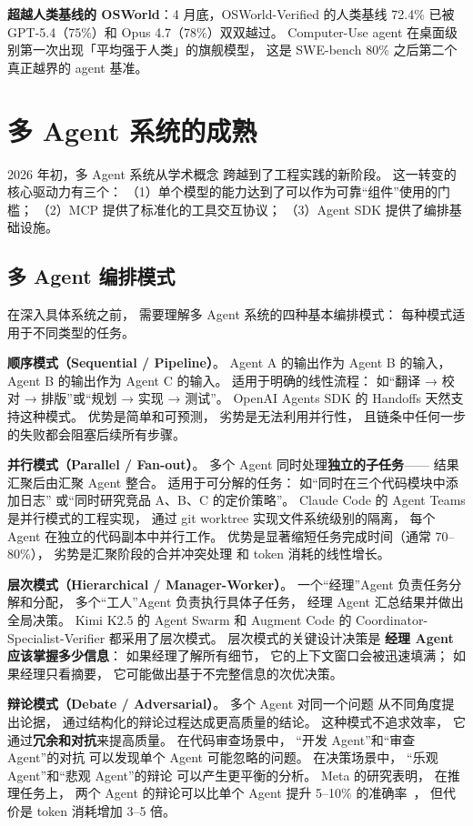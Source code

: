\textbf{超越人类基线的 OSWorld}：4 月底，OSWorld-Verified 的人类基线 72.4\%
已被 GPT-5.4（75\%）和 Opus 4.7（78\%）双双越过。
Computer-Use agent 在桌面级别第一次出现「平均强于人类」的旗舰模型，
这是 SWE-bench 80\% 之后第二个真正越界的 agent 基准。


\section{多 Agent 系统的成熟}
\label{sec:multi-agent-maturity}

2026 年初，多 Agent 系统从学术概念
跨越到了工程实践的新阶段。
这一转变的核心驱动力有三个：
（1）单个模型的能力达到了可以作为可靠“组件”使用的门槛；
（2）MCP 提供了标准化的工具交互协议；
（3）Agent SDK 提供了编排基础设施。

\subsection{多 Agent 编排模式}

在深入具体系统之前，
需要理解多 Agent 系统的四种基本编排模式：
每种模式适用于不同类型的任务。

\textbf{顺序模式（Sequential / Pipeline）}。
Agent A 的输出作为 Agent B 的输入，
Agent B 的输出作为 Agent C 的输入。
适用于明确的线性流程：
如“翻译 → 校对 → 排版”或“规划 → 实现 → 测试”。
OpenAI Agents SDK 的 Handoffs 天然支持这种模式。
优势是简单和可预测，
劣势是无法利用并行性，
且链条中任何一步的失败都会阻塞后续所有步骤。

\textbf{并行模式（Parallel / Fan-out）}。
多个 Agent 同时处理\textbf{独立的子任务}——
结果汇聚后由汇聚 Agent 整合。
适用于可分解的任务：
如“同时在三个代码模块中添加日志”
或“同时研究竞品 A、B、C 的定价策略”。
Claude Code 的 Agent Teams 是并行模式的工程实现，
通过 git worktree 实现文件系统级别的隔离，
每个 Agent 在独立的代码副本中并行工作。
优势是显著缩短任务完成时间（通常 70--80\%），
劣势是汇聚阶段的合并冲突处理
和 token 消耗的线性增长。

\textbf{层次模式（Hierarchical / Manager-Worker）}。
一个“经理”Agent 负责任务分解和分配，
多个“工人”Agent 负责执行具体子任务，
经理 Agent 汇总结果并做出全局决策。
Kimi K2.5 的 Agent Swarm 和
Augment Code 的 Coordinator-Specialist-Verifier
都采用了层次模式。
层次模式的关键设计决策是
\textbf{经理 Agent 应该掌握多少信息}：
如果经理了解所有细节，
它的上下文窗口会被迅速填满；
如果经理只看摘要，
它可能做出基于不完整信息的次优决策。

\textbf{辩论模式（Debate / Adversarial）}。
多个 Agent 对同一个问题
从不同角度提出论据，
通过结构化的辩论过程达成更高质量的结论。
这种模式不追求效率，
它通过\textbf{冗余和对抗}来提高质量。
在代码审查场景中，
“开发 Agent”和“审查 Agent”的对抗
可以发现单个 Agent 可能忽略的问题。
在决策场景中，
“乐观 Agent”和“悲观 Agent”的辩论
可以产生更平衡的分析。
Meta 的研究表明，
在推理任务上，
两个 Agent 的辩论可以比单个 Agent
提升 5--10\% 的准确率~\cite{du2023debate}，
但代价是 token 消耗增加 3--5 倍。

